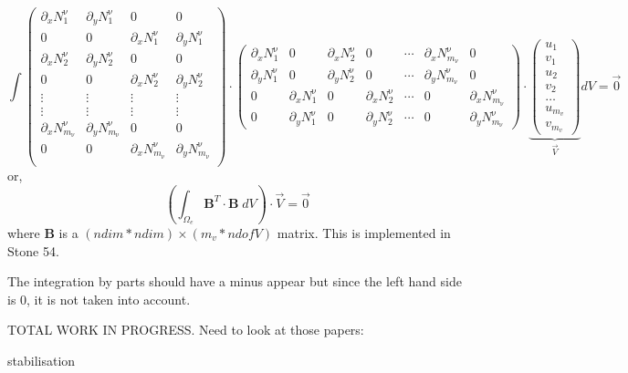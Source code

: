 \[
\int
\left(
\begin{array}{cccc}
\partial_x N_1^\upnu & \partial_y N_1^\upnu & 0 & 0 \\ 
0 & 0 & \partial_x N_1^\upnu & \partial_y N_1^\upnu  \\ 
\partial_x N_2^\upnu & \partial_y N_2^\upnu & 0 & 0 \\ 
0 & 0 & \partial_x N_2^\upnu & \partial_y N_2^\upnu  \\ 
\vdots & \vdots & \vdots & \vdots \\
\vdots & \vdots & \vdots & \vdots \\
\partial_x N_{m_\upnu}^\upnu & \partial_y N_{m_\upnu}^\upnu & 0 & 0 \\ 
0 & 0 & \partial_x N_{m_\upnu}^\upnu & \partial_y N_{m_\upnu}^\upnu  \\ 
\end{array}
\right)
\cdot
\left(
\begin{array}{cccccccccc}
\partial_x N_1^\upnu & 0  & \partial_x N_2^\upnu & 0  & \cdots & \partial_x N^\upnu_{m_\upnu} & 0 \\
\partial_y N_1^\upnu & 0  & \partial_y N_2^\upnu & 0  & \cdots & \partial_y N^\upnu_{m_\upnu} & 0 \\
0 & \partial_x N_1^\upnu  & 0& \partial_x N_2^\upnu  & \cdots & 0 & \partial_x N^\upnu_{m_\upnu}  \\
0 & \partial_y N_1^\upnu  & 0& \partial_y N_2^\upnu  & \cdots & 0 & \partial_y N^\upnu_{m_\upnu}  
\end{array}
\right) 
\cdot
\underbrace{
\left(
\begin{array}{c}
u_1 \\ v_1 \\ u_2 \\ v_2 \\ \dots \\ u_{m_v} \\ v_{m_v} 
\end{array}
\right) }_{\vec V}
dV
=\vec{0}
\]
or, 
\[
\left( \int_{\Omega_e} {\bm B}^T  \cdot {\bm B} \; dV \right)\cdot \vec{V} = \vec{0}
\]
where ${\bm B}$ is a $(ndim*ndim) \times (m_v*ndofV)$ matrix. This is implemented in 
Stone 54.

\begin{remark}
The integration by parts should have a minus appear but since the left hand side 
is 0, it is not taken into account. 
\end{remark}











\vspace{4cm}
TOTAL WORK IN PROGRESS. Need to look at those papers:
\cite{huli88}
\cite{bens89}
\cite{dumg11}
\cite{dumy16} 
\cite{anmp15}
\cite{krwd12}
\cite{stcl10}
\cite{maie12}
\cite{guez96}\cite{zhgm96}

stabilisation \cite{kamm10,qube11,dumg11}
